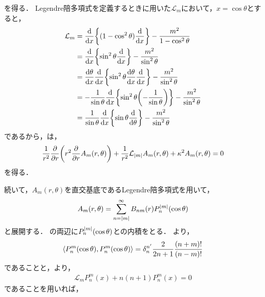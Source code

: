 \documentclass{report}
\begin{document}
    を得る．
    Legendre陪多項式を定義するときに用いた$\mathcal{L}_m$において，$x = \cos\theta$とすると，
    \begin{align}
      \mathcal{L}_m &= \dv{x}\qty{(1 - \cos^2\theta)\dv{x}} - \frac{m^2}{1 - \cos^2\theta} \\ 
      &= \dv{x}\qty{\sin^2\theta\dv{x}} - \frac{m^2}{\sin^2\theta} \\ 
      &= \dv{\theta}{x}\dv{x}\qty{\sin^2\theta\dv{\theta}{x}\dv{x}} - \frac{m^2}{\sin^2\theta} \\ 
      &= -\frac{1}{\sin\theta}\dv{x}\qty{\sin^2\theta\qty(-\frac{1}{\sin\theta})} - \frac{m^2}{\sin^2\theta} \\ 
      &= \frac{1}{\sin\theta}\dv{x}\qty{\sin\theta\dv{\theta}} - \frac{m^2}{\sin^2\theta}
    \end{align}
    であるから，は，
    \begin{align}
      \frac{1}{r^2}\pdv{r}\qty(r^2\pdv{r}A_m(r, \theta)) + \frac{1}{r^2}\mathcal{L}_{\abs{m}}A_m(r, \theta) + \kappa^2 A_m(r, \theta) = 0 \label{a-condition-use-lm}
    \end{align}
    を得る．
    \par
    続いて，$A_m(r, \theta)$を直交基底であるLegendre陪多項式を用いて，
    \begin{align}
      A_m(r, \theta) = \sum_{n = \abs{m}}^{\infty}B_{nm}(r)P_{n}^{\abs{m}}(\cos\theta)
    \end{align}
    と展開する．
    の両辺に$P_{n}^{\abs{m}}(\cos\theta)$との内積をとる．
    より，
    \begin{align}
      \left\langle P_n^{m}(\cos\theta), P_n^{m}(\cos\theta) \right\rangle = \delta_{n}^{n'}\frac{2}{2n + 1}\frac{(n + m)!}{(n - m)!}
    \end{align}
    であることと，より，
    \begin{align}
      \mathcal{L}_mP_n^m(x) + n(n + 1)P_n^m(x) = 0
    \end{align}
    であることを用いれば，
\end{document}
